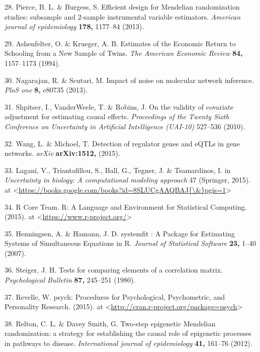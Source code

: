 \documentclass[]{article}
\begin{document}
\hypertarget{ref-Pierce2013}{}
28. Pierce, B. L. \& Burgess, S. Efficient design for Mendelian
randomization studies: subsample and 2-sample instrumental variable
estimators. \emph{American journal of epidemiology} \textbf{178,}
1177--84 (2013).

\hypertarget{ref-Ashenfelter1994}{}
29. Ashenfelter, O. \& Krueger, A. B. Estimates of the Economic Return
to Schooling from a New Sample of Twins. \emph{The American Economic
Review} \textbf{84,} 1157--1173 (1994).

\hypertarget{ref-Nagarajan2013}{}
30. Nagarajan, R. \& Scutari, M. Impact of noise on molecular network
inference. \emph{PloS one} \textbf{8,} e80735 (2013).

\hypertarget{ref-Shpitser2010}{}
31. Shpitser, I., VanderWeele, T. \& Robins, J. On the validity of
covariate adjustment for estimating causal effects. \emph{Proceedings of
the Twenty Sixth Conference on Uncertainty in Artificial Intelligence
(UAI-10)} 527--536 (2010).

\hypertarget{ref-Wang2015}{}
32. Wang, L. \& Michoel, T. Detection of regulator genes and eQTLs in
gene networks. \emph{arXiv} \textbf{arXiv:1512,} (2015).

\hypertarget{ref-Lagani2015}{}
33. Lagani, V., Triantafillou, S., Ball, G., Tegner, J. \& Tsamardinos,
I. in \emph{Uncertainty in biology: A computational modeling approach}
47 (Springer, 2015). at
\textless{}\href{https://books.google.com/books?id=8SLUCgAAQBAJ\%7B/\&\%7Dpgis=1}{https://books.google.com/books?id=8SLUCgAAQBAJ\{\textbackslash{}\&\}pgis=1}\textgreater{}

\hypertarget{ref-RCoreTeam2015}{}
34. R Core Team. R: A Language and Environment for Statistical
Computing. (2015). at
\textless{}\url{https://www.r-project.org/}\textgreater{}

\hypertarget{ref-Henningsen2007}{}
35. Henningsen, A. \& Hamann, J. D. systemfit : A Package for Estimating
Systems of Simultaneous Equations in R. \emph{Journal of Statistical
Software} \textbf{23,} 1--40 (2007).

\hypertarget{ref-Steiger1980}{}
36. Steiger, J. H. Tests for comparing elements of a correlation matrix.
\emph{Psychological Bulletin} \textbf{87,} 245--251 (1980).

\hypertarget{ref-Revelle2015}{}
37. Revelle, W. psych: Procedures for Psychological, Psychometric, and
Personality Research. (2015). at
\textless{}\url{http://cran.r-project.org/package=psych}\textgreater{}

\hypertarget{ref-Relton2012}{}
38. Relton, C. L. \& Davey Smith, G. Two-step epigenetic Mendelian
randomization: a strategy for establishing the causal role of epigenetic
processes in pathways to disease. \emph{International journal of
epidemiology} \textbf{41,} 161--76 (2012).
\end{document}
